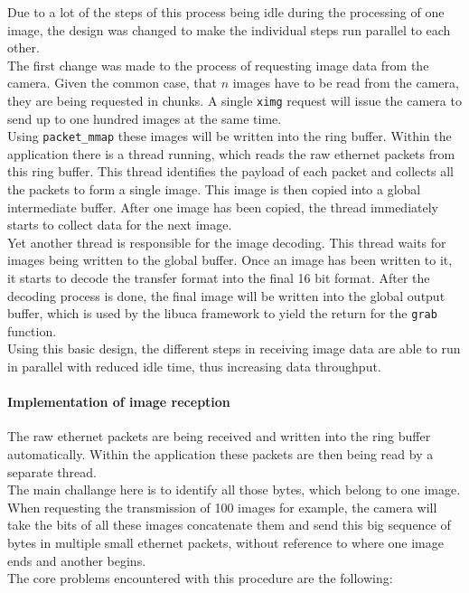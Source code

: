 Due to a lot of the steps of this process being idle during the processing of one image, the design was changed to make the individual steps run parallel to each other.\\
The first change was made to the process of requesting image data from the camera. Given the common case, that $n$ images have to be read from the camera, they are being requested in chunks. A single \texttt{ximg} request will issue the camera to send up to one hundred images at the same time.\\
Using \texttt{packet\_mmap} these images will be written into the ring buffer. Within the application there is a thread running, which reads the raw ethernet packets from this ring buffer. This thread identifies the payload of each packet and collects all the packets to form a single image. This image is then copied into a global intermediate buffer. After one image has been copied, the thread immediately starts to collect data for the next image.\\
Yet another thread is responsible for the image decoding. This thread waits for images being written to the global buffer. Once an image has been written to it, it starts to decode the transfer format into the final 16 bit format. After the decoding process is done, the final image will be written into the global output buffer, which is used by the libuca framework to yield the return for the \texttt{grab} function.\\
Using this basic design, the different steps in receiving image data are able to run in parallel with reduced idle time, thus increasing data throughput.

\paragraph{Implementation of image reception}

The raw ethernet packets are being received and written into the ring buffer automatically. Within the application these packets are then being read by a separate thread.\\
The main challange here is to identify all those bytes, which belong to one image. When requesting the transmission of 100 images for example, the camera will take the bits of all these images concatenate them and send this big sequence of bytes in multiple small ethernet packets, without reference to where one image ends and another begins.\\
The core problems encountered with this procedure are the following:

